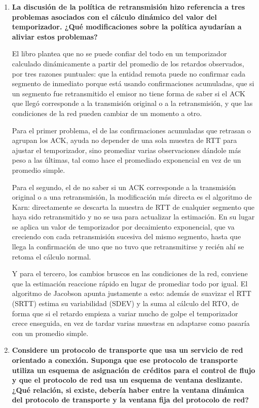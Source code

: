 \documentclass[11pt,a4paper]{article}
\begin{document}
\begin{enumerate}
    \item[\textbf{20.7}] \textbf{La discusión de la política de retransmisión hizo referencia a tres problemas asociados con el cálculo dinámico del valor del temporizador. ¿Qué modificaciones sobre la política ayudarían a aliviar estos problemas?}

    El libro plantea que no se puede confiar del todo en un temporizador calculado dinámicamente a partir del promedio de los retardos observados, por tres razones puntuales: que la entidad remota puede no confirmar cada segmento de inmediato porque está usando confirmaciones acumuladas, que si un segmento fue retransmitido el emisor no tiene forma de saber si el ACK que llegó corresponde a la transmisión original o a la retransmisión, y que las condiciones de la red pueden cambiar de un momento a otro.

    Para el primer problema, el de las confirmaciones acumuladas que retrasan o agrupan los ACK, ayuda no depender de una sola muestra de RTT para ajustar el temporizador, sino promediar varias observaciones dándole más peso a las últimas, tal como hace el promediado exponencial en vez de un promedio simple.

    Para el segundo, el de no saber si un ACK corresponde a la transmisión original o a una retransmisión, la modificación más directa es el algoritmo de Karn: directamente se descarta la muestra de RTT de cualquier segmento que haya sido retransmitido y no se usa para actualizar la estimación. En su lugar se aplica un valor de temporizador por decaimiento exponencial, que va creciendo con cada retransmisión sucesiva del mismo segmento, hasta que llega la confirmación de uno que no tuvo que retransmitirse y recién ahí se retoma el cálculo normal.

    Y para el tercero, los cambios bruscos en las condiciones de la red, conviene que la estimación reaccione rápido en lugar de promediar todo por igual. El algoritmo de Jacobson apunta justamente a esto: además de suavizar el RTT (SRTT) estima su variabilidad (SDEV) y la suma al cálculo del RTO, de forma que si el retardo empieza a variar mucho de golpe el temporizador crece enseguida, en vez de tardar varias muestras en adaptarse como pasaría con un promedio simple.

    \item[\textbf{20.8}] \textbf{Considere un protocolo de transporte que usa un servicio de red orientado a conexión. Suponga que ese protocolo de transporte utiliza un esquema de asignación de créditos para el control de flujo y que el protocolo de red usa un esquema de ventana deslizante. ¿Qué relación, si existe, debería haber entre la ventana dinámica del protocolo de transporte y la ventana fija del protocolo de red?}


\end{enumerate}
\end{document}
